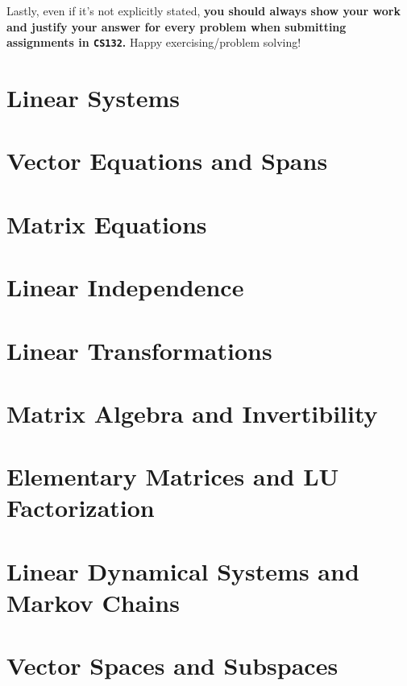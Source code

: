 \documentclass[10pt]{report}
\begin{document}
Lastly, even if it's not explicitly stated, \textbf{you should always
  show your work and justify your answer for every problem when
  submitting assignments in \texttt{CS132}.}  Happy exercising/problem
solving!

\chapter{Linear Systems}


\chapter{Vector Equations and Spans}


\chapter{Matrix Equations}


\chapter{Linear Independence}


\chapter{Linear Transformations}


\chapter{Matrix Algebra and Invertibility}


\chapter{Elementary Matrices and LU Factorization}


\chapter{Linear Dynamical Systems and Markov Chains}


\chapter{Vector Spaces and Subspaces}

\end{document}
